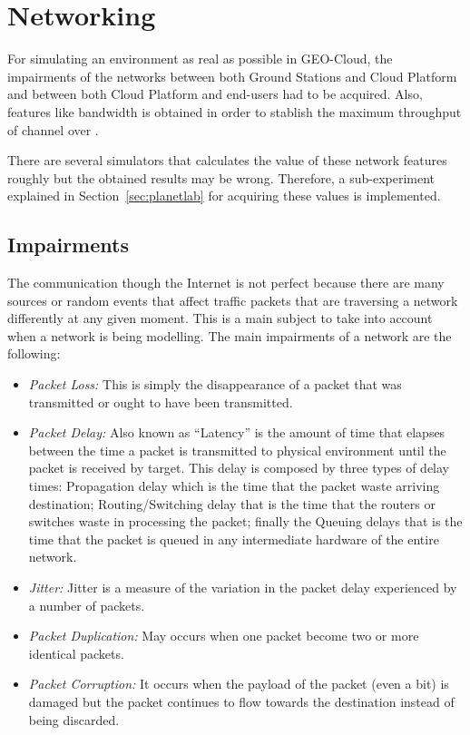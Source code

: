 \section{Networking}

For simulating an environment as real as possible in GEO-Cloud, the impairments  of the networks between both Ground Stations and Cloud Platform
and between both Cloud Platform and end-users had to be acquired. Also, features
like bandwidth is obtained in order to stablish the maximum throughput of
channel over \vw.

There are several simulators that
calculates the value of these network features roughly but the obtained results
may be wrong. Therefore, a sub-experiment explained in
Section~\ref{sec:planetlab} for acquiring these values is implemented. 

\subsection{Impairments}

The communication though the Internet is not perfect because there are many
sources or random events that affect traffic packets that are traversing a
network differently at any given moment. This is a main
subject to take into account when a network is being modelling. The main
impairments
 of a network are the following:

\begin{itemize}
\item \emph{Packet Loss:} This is simply the disappearance of a packet that was
  transmitted or ought to have been transmitted.
\item \emph{Packet Delay:} Also known as ``Latency'' is the amount of time that elapses between the time a
  packet is transmitted to physical environment until the packet is received by
  target. This delay is composed by three types of delay times: Propagation
  delay which is the time that the packet waste arriving destination;
  Routing/Switching delay that is the time that the routers or
  switches waste in processing the packet; finally the Queuing delays that is
  the time that the packet is queued in any intermediate hardware of the entire network.
\item \emph{Jitter:} Jitter is a measure of the variation in the packet delay
  experienced by a number of packets. 
\item \emph{Packet Duplication:} May occurs when one packet become two or more
  identical packets.
\item \emph{Packet Corruption:} It occurs when the payload of the packet (even a bit)
  is damaged but the packet continues to flow towards the destination instead of
  being discarded.
\end{itemize}

